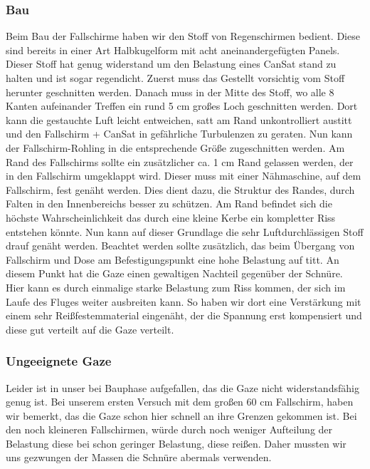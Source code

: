 \subsubsection{Bau}
Beim Bau der Fallschirme haben wir den Stoff von Regenschirmen bedient. Diese sind bereits in einer Art Halbkugelform mit acht aneinandergefügten Panels. Dieser Stoff hat genug widerstand um den Belastung eines CanSat stand zu halten und ist sogar regendicht. Zuerst muss das Gestellt vorsichtig vom Stoff herunter geschnitten werden. Danach muss in der Mitte des Stoff, wo alle 8 Kanten aufeinander Treffen ein rund 5 cm großes Loch geschnitten werden. Dort kann die gestauchte Luft leicht entweichen, satt am Rand unkontrolliert austitt und den Fallschirm + CanSat in gefährliche Turbulenzen zu geraten. Nun kann der Fallschirm-Rohling in die entsprechende Größe zugeschnitten werden. Am Rand des Fallschirms sollte ein zusätzlicher ca. 1 cm Rand gelassen werden, der in den Fallschirm umgeklappt wird. Dieser muss mit einer Nähmaschine, auf dem Fallschirm, fest genäht werden. Dies dient dazu, die Struktur des Randes, durch Falten in den Innenbereichs besser zu schützen. Am Rand befindet sich die höchste Wahrscheinlichkeit das durch eine kleine Kerbe ein kompletter Riss entstehen könnte. Nun kann auf dieser Grundlage die sehr Luftdurchlässigen Stoff drauf genäht werden. Beachtet werden sollte zusätzlich, das beim Übergang von Fallschirm und Dose am Befestigungspunkt eine hohe Belastung auf titt. An diesem Punkt hat die Gaze einen gewaltigen Nachteil gegenüber der Schnüre. Hier kann es durch einmalige starke Belastung zum Riss kommen, der sich im Laufe des Fluges weiter ausbreiten kann. So haben wir dort eine Verstärkung mit einem sehr Reißfestemmaterial eingenäht, der die Spannung erst kompensiert und diese gut verteilt auf die Gaze verteilt.

\subsubsection{Ungeeignete Gaze}
Leider ist in unser bei Bauphase aufgefallen, das die Gaze nicht widerstandsfähig genug ist. Bei unserem ersten Versuch mit dem großen 60 cm Fallschirm, haben wir bemerkt, das die Gaze schon hier schnell an ihre Grenzen gekommen ist. Bei den noch kleineren Fallschirmen, würde durch noch weniger Aufteilung der Belastung diese bei schon geringer Belastung, diese reißen. Daher mussten wir uns gezwungen der Massen die Schnüre abermals verwenden.

